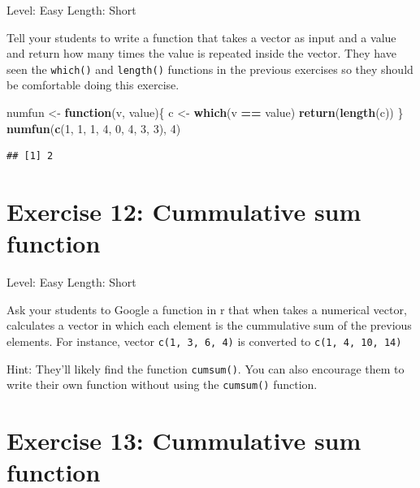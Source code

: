 \documentclass[]{book}
\newenvironment{Shaded}{\begin{snugshade}}{\end{snugshade}}
\newcommand{\ControlFlowTok}[1]{\textcolor[rgb]{0.13,0.29,0.53}{\textbf{#1}}}
\newcommand{\DecValTok}[1]{\textcolor[rgb]{0.00,0.00,0.81}{#1}}
\newcommand{\KeywordTok}[1]{\textcolor[rgb]{0.13,0.29,0.53}{\textbf{#1}}}
\newcommand{\NormalTok}[1]{#1}
\newcommand{\OperatorTok}[1]{\textcolor[rgb]{0.81,0.36,0.00}{\textbf{#1}}}
\newcommand{\StringTok}[1]{\textcolor[rgb]{0.31,0.60,0.02}{#1}}
\begin{document}
Level: Easy
Length: Short

Tell your students to write a function that takes a vector as input and a value and return how many times the value is repeated inside the vector. They have seen the \texttt{which()} and \texttt{length()} functions in the previous exercises so they should be comfortable doing this exercise.

\begin{Shaded}
\begin{Highlighting}[]
\NormalTok{numfun <-}\StringTok{  }\ControlFlowTok{function}\NormalTok{(v, value)\{}
\NormalTok{    c <-}\StringTok{ }\KeywordTok{which}\NormalTok{(v }\OperatorTok{==}\StringTok{ }\NormalTok{value)}
    \KeywordTok{return}\NormalTok{(}\KeywordTok{length}\NormalTok{(c))}
\NormalTok{\}}
\KeywordTok{numfun}\NormalTok{(}\KeywordTok{c}\NormalTok{(}\DecValTok{1}\NormalTok{, }\DecValTok{1}\NormalTok{, }\DecValTok{1}\NormalTok{, }\DecValTok{4}\NormalTok{, }\DecValTok{0}\NormalTok{, }\DecValTok{4}\NormalTok{, }\DecValTok{3}\NormalTok{, }\DecValTok{3}\NormalTok{), }\DecValTok{4}\NormalTok{)}
\end{Highlighting}
\end{Shaded}

\begin{verbatim}
## [1] 2
\end{verbatim}

\hypertarget{exercise-12-cummulative-sum-function}{%
\section*{Exercise 12: Cummulative sum function}\label{exercise-12-cummulative-sum-function}}

Level: Easy
Length: Short

Ask your students to Google a function in r that when takes a numerical vector, calculates a vector in which each element is the cummulative sum of the previous elements. For instance, vector \texttt{c(1,\ 3,\ 6,\ 4)} is converted to \texttt{c(1,\ 4,\ 10,\ 14)}

Hint: They'll likely find the function \texttt{cumsum()}. You can also encourage them to write their own function without using the \texttt{cumsum()} function.

\hypertarget{exercise-13-cummulative-sum-function}{%
\section*{Exercise 13: Cummulative sum function}\label{exercise-13-cummulative-sum-function}}
\end{document}
